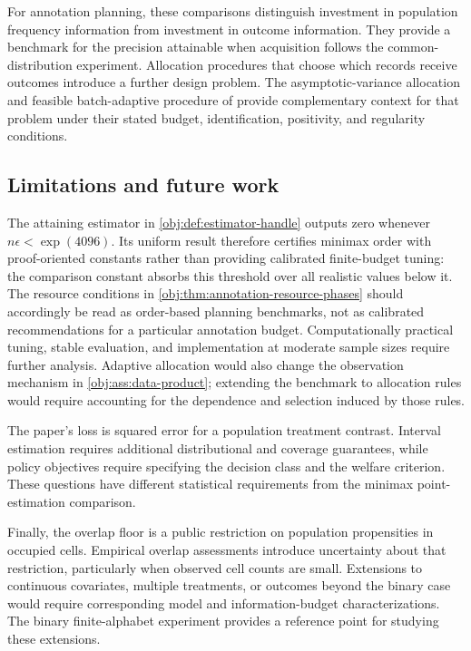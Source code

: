 For annotation planning, these comparisons distinguish investment in population frequency information from investment in outcome information. They provide a benchmark for the precision attainable when acquisition follows the common-distribution experiment. Allocation procedures that choose which records receive outcomes introduce a further design problem. The asymptotic-variance allocation and feasible batch-adaptive procedure of \citet[Theorems 4.2 and 5.1 of the arXiv manuscript]{NwankwoGoldkindZhou2026Annotations} provide complementary context for that problem under their stated budget, identification, positivity, and regularity conditions.

\subsection{Limitations and future work}

The attaining estimator in \cref{obj:def:estimator-handle} outputs zero whenever \(n\epsilon<\exp(4096)\). Its uniform result therefore certifies minimax order with proof-oriented constants rather than providing calibrated finite-budget tuning: the comparison constant absorbs this threshold over all realistic values below it. The resource conditions in \cref{obj:thm:annotation-resource-phases} should accordingly be read as order-based planning benchmarks, not as calibrated recommendations for a particular annotation budget. Computationally practical tuning, stable evaluation, and implementation at moderate sample sizes require further analysis. Adaptive allocation would also change the observation mechanism in \cref{obj:ass:data-product}; extending the benchmark to allocation rules would require accounting for the dependence and selection induced by those rules.

The paper's loss is squared error for a population treatment contrast. Interval estimation requires additional distributional and coverage guarantees, while policy objectives require specifying the decision class and the welfare criterion. These questions have different statistical requirements from the minimax point-estimation comparison.

Finally, the overlap floor is a public restriction on population propensities in occupied cells. Empirical overlap assessments introduce uncertainty about that restriction, particularly when observed cell counts are small. Extensions to continuous covariates, multiple treatments, or outcomes beyond the binary case would require corresponding model and information-budget characterizations. The binary finite-alphabet experiment provides a reference point for studying these extensions.
